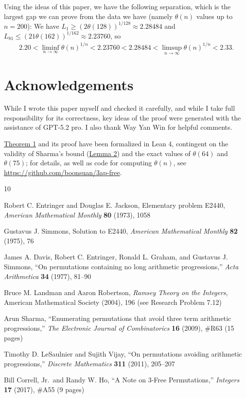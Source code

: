 \documentclass[twoside, reqno]{amsart} %
\begin{document}
Using the ideas of this paper, we have the following separation,
which is the largest gap we can prove from the data we have
(namely $\theta(n)$ values up to $n=200$):
We have $L_1\ge(2\theta(128))^{1/128}\approx2.28484$ and
$L_{81}\le(21\theta(162))^{1/162}\approx2.23760$, so
\begin{align*}
2.20
<\liminf_{n\to\infty}\theta(n)^{1/n}
<2.23760
<2.28484
<\limsup_{n\to\infty}\theta(n)^{1/n}
<2.33.
\end{align*} 

\section*{Acknowledgements}
While I wrote this paper myself and checked it carefully,
and while I take full responsibility for its correctness, 
key ideas of the proof were generated with the assistance of GPT-5.2 pro.  
I also thank Way Yan Win for helpful comments.

\hyperref[theorem:1]{Theorem 1} and its proof have been formalized in Lean 4, contingent on the validity
of Sharma's bound (\hyperref[lemma:2]{Lemma 2}) and the exact values of $\theta(64)$ and $\theta(75)$;
for details, as well as code for computing $\theta(n)$, see \url{https://github.com/boonsuan/3ap-free}.




\begin{thebibliography}{10}

Robert C. Entringer and Douglas E. Jackson, Elementary problem E2440, 
\textsl{American Mathematical Monthly} \textbf{80}
(1973), 1058

Gustavus J. Simmons, Solution to E2440, 
\textsl{American Mathematical Monthly} \textbf{82} (1975), 76

James A. Davis, Robert C. Entringer, Ronald L. Graham, and Gustavus J. Simmons,
``On permutations containing no long arithmetic progressions,''
\textsl{Acta Arithmetica} \textbf{34} (1977), 81--90

Bruce M. Landman and Aaron Robertson, \emph{Ramsey Theory on the Integers}, 
American Mathematical Society (2004), 196 (see Research Problem 7.12)

Arun Sharma, ``Enumerating permutations that avoid three term arithmetic progressions,'' 
\textsl{The Electronic Journal of Combinatorics} \textbf{16} (2009), \#R63 (15 pages)

Timothy D. LeSaulnier and Sujith Vijay, ``On permutations avoiding arithmetic progressions,'' 
\textsl{Discrete Mathematics} \textbf{311} (2011), 205--207

Bill Correll, Jr.~and Randy W. Ho, ``A Note on $3$-Free Permutations,''
\textsl{Integers} \textbf{17} (2017), \#A55 (9 pages)
\end{thebibliography}
\end{document}
